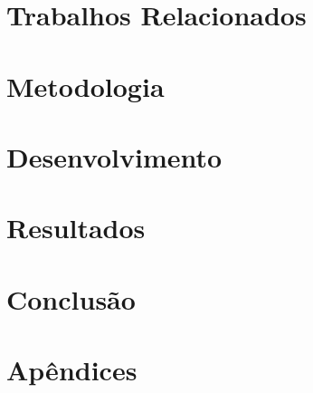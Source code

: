 \documentclass[12pt,openright,twoside,a4paper]{abntex2}
\begin{document}
\chapter{Trabalhos Relacionados}
\lipsum[4]

\chapter{Metodologia}


\chapter{Desenvolvimento}


\chapter{Resultados}


\chapter{Conclusão}




\appendix
\chapter{Apêndices}
\lipsum[9]
\end{document}

